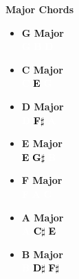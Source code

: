 \documentclass[a4paper,landscape]{article}
\newcommand{\noteBadge}[3]{%
    \colorbox{#1}{\textcolor{#2}{\textbf{#3}}}%
}
\begin{document}
\begin{multicols}{4}
\sffamily\small

\noindent
\textbf{Major Chords}
\begin{itemize}
    \item \textbf{G Major} \\
          \noteBadge{colorG}{white}{G} \quad \noteBadge{colorB}{white}{B} \quad \noteBadge{colorD}{white}{D}
    \item \textbf{C Major} \\
          \noteBadge{colorC}{white}{C} \quad \noteBadge{colorE}{black}{E} \quad \noteBadge{colorG}{white}{G}
    \item \textbf{D Major} \\
          \noteBadge{colorD}{white}{D} \quad \noteBadge{colorFs}{black}{F$\sharp$} \quad \noteBadge{colorA}{white}{A}
    \item \textbf{E Major} \\
          \noteBadge{colorE}{black}{E} \quad \noteBadge{colorGs}{black}{G$\sharp$} \quad \noteBadge{colorB}{white}{B}
    \item \textbf{F Major} \\
          \noteBadge{colorF}{white}{F} \quad \noteBadge{colorA}{white}{A} \quad \noteBadge{colorC}{white}{C}
    \item \textbf{A Major} \\
          \noteBadge{colorA}{white}{A} \quad \noteBadge{colorCs}{black}{C$\sharp$} \quad \noteBadge{colorE}{black}{E}
    \item \textbf{B Major} \\
          \noteBadge{colorB}{white}{B} \quad \noteBadge{colorDs}{black}{D$\sharp$} \quad \noteBadge{colorFs}{black}{F$\sharp$}
\end{itemize}

\columnbreak


\end{multicols}
\end{document}
